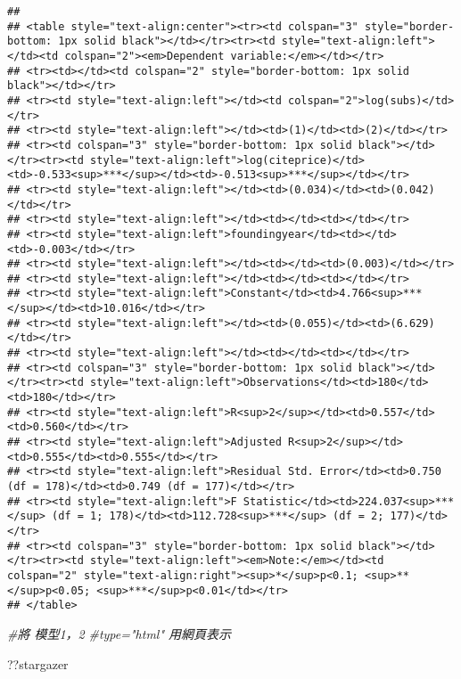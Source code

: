 \documentclass[]{article}
\newenvironment{Shaded}{\begin{snugshade}}{\end{snugshade}}
\newcommand{\CommentTok}[1]{\textcolor[rgb]{0.56,0.35,0.01}{\textit{#1}}}
\begin{document}
\begin{verbatim}
## 
## <table style="text-align:center"><tr><td colspan="3" style="border-bottom: 1px solid black"></td></tr><tr><td style="text-align:left"></td><td colspan="2"><em>Dependent variable:</em></td></tr>
## <tr><td></td><td colspan="2" style="border-bottom: 1px solid black"></td></tr>
## <tr><td style="text-align:left"></td><td colspan="2">log(subs)</td></tr>
## <tr><td style="text-align:left"></td><td>(1)</td><td>(2)</td></tr>
## <tr><td colspan="3" style="border-bottom: 1px solid black"></td></tr><tr><td style="text-align:left">log(citeprice)</td><td>-0.533<sup>***</sup></td><td>-0.513<sup>***</sup></td></tr>
## <tr><td style="text-align:left"></td><td>(0.034)</td><td>(0.042)</td></tr>
## <tr><td style="text-align:left"></td><td></td><td></td></tr>
## <tr><td style="text-align:left">foundingyear</td><td></td><td>-0.003</td></tr>
## <tr><td style="text-align:left"></td><td></td><td>(0.003)</td></tr>
## <tr><td style="text-align:left"></td><td></td><td></td></tr>
## <tr><td style="text-align:left">Constant</td><td>4.766<sup>***</sup></td><td>10.016</td></tr>
## <tr><td style="text-align:left"></td><td>(0.055)</td><td>(6.629)</td></tr>
## <tr><td style="text-align:left"></td><td></td><td></td></tr>
## <tr><td colspan="3" style="border-bottom: 1px solid black"></td></tr><tr><td style="text-align:left">Observations</td><td>180</td><td>180</td></tr>
## <tr><td style="text-align:left">R<sup>2</sup></td><td>0.557</td><td>0.560</td></tr>
## <tr><td style="text-align:left">Adjusted R<sup>2</sup></td><td>0.555</td><td>0.555</td></tr>
## <tr><td style="text-align:left">Residual Std. Error</td><td>0.750 (df = 178)</td><td>0.749 (df = 177)</td></tr>
## <tr><td style="text-align:left">F Statistic</td><td>224.037<sup>***</sup> (df = 1; 178)</td><td>112.728<sup>***</sup> (df = 2; 177)</td></tr>
## <tr><td colspan="3" style="border-bottom: 1px solid black"></td></tr><tr><td style="text-align:left"><em>Note:</em></td><td colspan="2" style="text-align:right"><sup>*</sup>p<0.1; <sup>**</sup>p<0.05; <sup>***</sup>p<0.01</td></tr>
## </table>
\end{verbatim}

\begin{Shaded}
\begin{Highlighting}[]
\CommentTok{#將 模型1，2}
\CommentTok{#type="html" 用網頁表示}
\end{Highlighting}
\end{Shaded}

??stargazer
\end{document}
